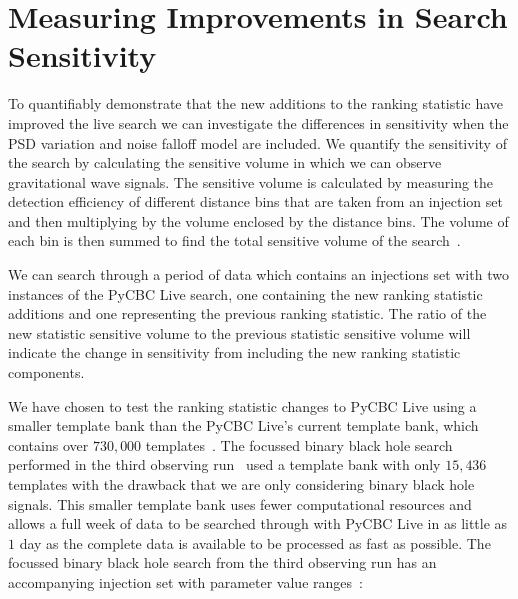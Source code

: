 \section{\label{sec:pycbclive-injection-tests}Measuring Improvements in Search Sensitivity}

To quantifiably demonstrate that the new additions to the ranking statistic have improved the live search we can investigate the differences in sensitivity when the PSD variation and noise falloff model are included. We quantify the sensitivity of the search by calculating the sensitive volume in which we can observe gravitational wave signals. The sensitive volume is calculated by measuring the detection efficiency of different distance bins that are taken from an injection set and then multiplying by the volume enclosed by the distance bins. The volume of each bin is then summed to find the total sensitive volume of the search~\cite{rw_snr_eq:2012}.

We can search through a period of data which contains an injections set with two instances of the PyCBC Live search, one containing the new ranking statistic additions and one representing the previous ranking statistic. The ratio of the new statistic sensitive volume to the previous statistic sensitive volume will indicate the change in sensitivity from including the new ranking statistic components.

We have chosen to test the ranking statistic changes to PyCBC Live using a smaller template bank than the PyCBC Live's current template bank, which contains over $730,000$ templates~\cite{PyCBC_Live:2018}. The focussed binary black hole search performed in the third observing run~\cite{PyCBC_focussed_bbh:2024} used a template bank with only $15,436$ templates with the drawback that we are only considering binary black hole signals. This smaller template bank uses fewer computational resources and allows a full week of data to be searched through with PyCBC Live in as little as $1$ day as the complete data is available to be processed as fast as possible. The focussed binary black hole search from the third observing run has an accompanying injection set with parameter value ranges~\cite{gwtc3:2023}:
%
%
%
%

